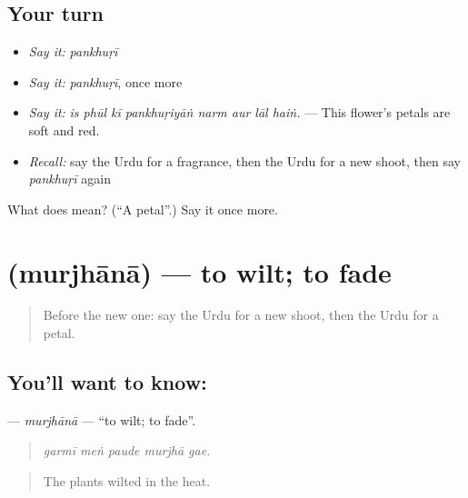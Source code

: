 \subsection*{Your turn}
\begin{itemize}
\raggedright
  \item \emph{Say it:} \emph{pankhuṛī}
  \item \emph{Say it:} \emph{pankhuṛī}, once more
  \item \emph{Say it:} \emph{is phūl kī pankhuṛiyāṅ narm aur lāl haiṅ.} — This flower's petals are soft and red.
  \item \emph{Recall:} say the Urdu for a fragrance, then the Urdu for a new shoot, then say \emph{pankhuṛī} again
\end{itemize}

\begin{tcolorbox}[breakable,colback=teal!4,colframe=teal!35!black,title={Before you move on}]
What does  mean? (\textquotedblleft{}A petal\textquotedblright{}.) Say it once more.
\end{tcolorbox}
\section[\texorpdfstring{\ur{مرجھانا} (murjhānā)}{مرجھانا (murjhānā)}]{ (murjhānā) — to wilt; to fade}

\label{lesson:UR-C436-murjhana}



\begin{quote}
Before the new one: say the Urdu for a new shoot, then the Urdu for a petal.
\end{quote}

\subsection*{You'll want to know: }
\textbf{} — \emph{murjhānā} — \textquotedblleft{}to wilt; to fade\textquotedblright{}.

\begin{quote}
    
\end{quote}

\begin{quote}
\emph{garmī meṅ paude murjhā gae.}
\end{quote}

\begin{quote}
The plants wilted in the heat.
\end{quote}


